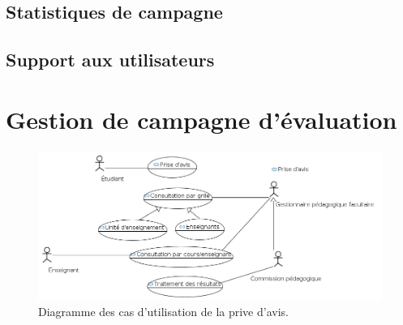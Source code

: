 \documentclass[a4paper,11pt]{report}
\begin{document}






\subsection{Statistiques de campagne}






\subsection{Support aux utilisateurs}
























\newpage
\section{Gestion de campagne d'évaluation}

\begin{figure}[ht]
\includegraphics[width=\linewidth]{workspace/evalens-usecases/prise_avis.png}
\caption{Diagramme des cas d'utilisation de la prive d'avis.}
\label{fig:usecase-avis}
\end{figure}
\end{document}
